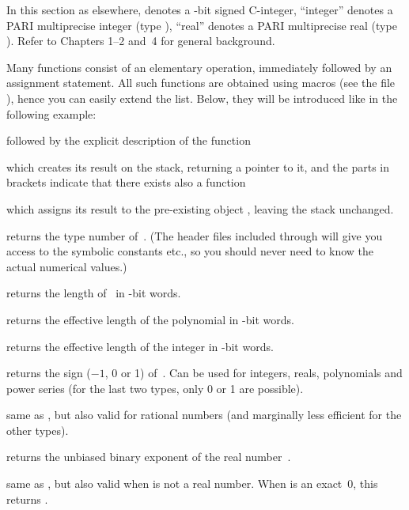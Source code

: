 \noindent
In this section as elsewhere,  denotes a \B-bit signed C-integer,
``integer'' denotes a PARI multiprecise integer (type ), ``real''
denotes a PARI multiprecise real (type ). Refer to Chapters
1--2 and~4 for general background.

 Many functions consist of an elementary operation,
immediately followed by an assignment statement. All such functions are
obtained using macros (see the file ), hence you can easily
extend the list. Below, they will be introduced like in the following
example:

 followed by the explicit
description of the function


\noindent which creates its result on the stack, returning a  pointer
to it, and the parts in brackets indicate that there exists also a function


\noindent which assigns its result to the pre-existing object
, leaving the stack unchanged.


 returns the type number of~. (The header files
included through  will give you access to the symbolic constants
 etc., so you should never need to know the actual numerical values.)

 returns the length of~ in \B-bit words.

 returns the effective length of the polynomial 
in \B-bit words.

 returns the effective length of the integer 
in \B-bit words.

 returns the sign ($-1$, 0 or 1) of~. Can be
used for integers, reals, polynomials and power series (for the last two
types, only 0 or 1 are possible).

 same as , but also valid for rational
numbers (and marginally less efficient for the other types).

 returns the unbiased binary exponent of the real
number~.

 same as , but also valid when 
is not a real number. When  is an exact~0, this returns
\hbox{}.

